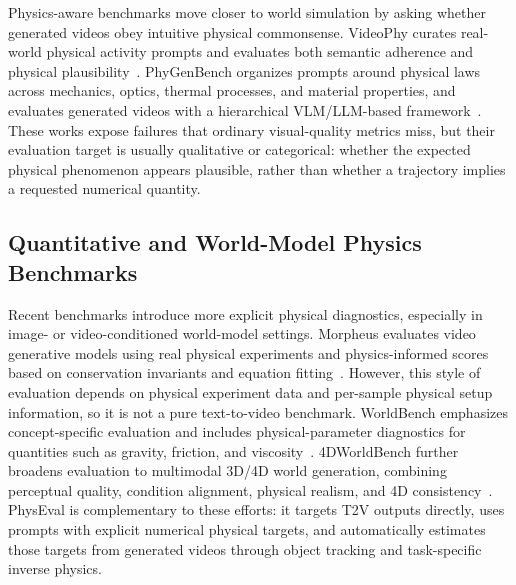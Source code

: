 \documentclass{article}
\newcommand{\bench}{PhysEval}
\begin{document}
Physics-aware benchmarks move closer to world simulation by asking whether generated videos obey intuitive physical commonsense.
VideoPhy curates real-world physical activity prompts and evaluates both semantic adherence and physical plausibility~\citep{bansal2024videophy}.
PhyGenBench organizes prompts around physical laws across mechanics, optics, thermal processes, and material properties, and evaluates generated videos with a hierarchical VLM/LLM-based framework~\citep{meng2024phygenbench}.
These works expose failures that ordinary visual-quality metrics miss, but their evaluation target is usually qualitative or categorical: whether the expected physical phenomenon appears plausible, rather than whether a trajectory implies a requested numerical quantity.

\subsection{Quantitative and World-Model Physics Benchmarks}

Recent benchmarks introduce more explicit physical diagnostics, especially in image- or video-conditioned world-model settings.
Morpheus evaluates video generative models using real physical experiments and physics-informed scores based on conservation invariants and equation fitting~\citep{zhang2025morpheus}.
However, this style of evaluation depends on physical experiment data and per-sample physical setup information, so it is not a pure text-to-video benchmark.
WorldBench emphasizes concept-specific evaluation and includes physical-parameter diagnostics for quantities such as gravity, friction, and viscosity~\citep{upadhyay2026worldbench}.
4DWorldBench further broadens evaluation to multimodal 3D/4D world generation, combining perceptual quality, condition alignment, physical realism, and 4D consistency~\citep{lu2025fourDworldbench}.
\bench{} is complementary to these efforts: it targets T2V outputs directly, uses prompts with explicit numerical physical targets, and automatically estimates those targets from generated videos through object tracking and task-specific inverse physics.
\end{document}
